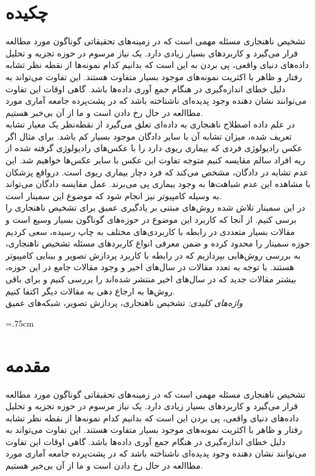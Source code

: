 \documentclass[12pt,a4paper]{report}
\newcommand*{\BeginNoToc}{%
  \addtocontents{toc}{%
    \edef\protect\SavedTocDepth{\protect\the\protect\value{tocdepth}}%
  }%
  \addtocontents{toc}{%
    \protect\setcounter{tocdepth}{-10}%
  }%
}
\newcommand*{\EndNoToc}{%
  \addtocontents{toc}{%
    \protect\setcounter{tocdepth}{\protect\SavedTocDepth}%
  }%
}
\theoremstyle{definition}
\theoremstyle{definition}
\begin{document}
	
	\chapter*{چکیده}
	تشخیص ناهنجاری‌ مسئله مهمی است که در زمینه‌های تحقیقاتی گوناگون مورد مطالعه قرار می‌گیرد و کاربرد‌های بسیار زیادی دارد. یک نیاز مرسوم در حوزه تجزیه و تحلیل داده‌های دنیای واقعی، پی بردن به این است که بدانیم کدام نمونه‌ها از نقطه نظر تشابه رفتار و ظاهر با اکثریت نمونه‌های موجود بسیار متفاوت هستند. این تفاوت می‌تواند به دلیل خطای انداز‌ه‌گیری در هنگام جمع آوری داده‌ها باشد. گاهی اوقات این تفاوت می‌توانند نشان‌ دهنده وجود پدیده‌ای ناشناخته‌ باشد که در پشت‌پرده جامعه آماری مورد مطاالعه در حال رخ دادن است و ما از آن بی‌خبر هستیم. \\

در علم داده اصطلاح ناهنجاری به داده‌ای تعلق می‌گیرد از نقطه‌نظر یک معیار تشابه تعریف شده، میزان تشابه آن با سایر دادگان موجود بسیار کم باشد. برای مثال اگر عکس رادیولوژی فردی که بیماری ریوی دارد را با عکس‌های رادیولوژی گرفته شده از ریه افراد سالم مقایسه کنیم متوجه تفاوت این عکس با سایر عکس‌ها خواهیم شد. این عدم تشابه در دادگان، مشخص می‌کند  که فرد دچار بیماری ریوی است. درواقع پزشکان با مشاهده این عدم شباهت‌ها به وجود بیماری پی می‌برند. عمل مقایسه دادگان می‌تواند به وسیله کامپیوتر نیز انجام شود که موضوع این سمینار است.\\

در این سمینار تلاش شده روش‌های مبتنی بر یادگیری عمیق برای تشخیص ناهنجاری را برسی کنیم. از آنجا که کاربرد این موضوع در حوزه‌های گوناگون بسیار وسیع است و مقالات بسیار متعددی در رابطه با کاربردی‌های مختلف به چاپ رسیده، سعی کردیم حوزه سمینار را محدود کرده و ضمن معرفی انواع کاربرد‌های مسئله تشخیص ناهنجاری، به بررسی روش‌هایی بپردازیم که در رابطه با کاربرد پردازش تصویر و بینایی کامپیوتر هستند. با توجه به تعدد مقالات در سال‌های اخیر و وجود مقالات جامع در این حوزه، بیشتر مقالات جدید که در سال‌های اخیر منتشر شده‌اند را بررسی کنیم و برای باقی روش‌ها به ارجاع دهی به مقالات دیگر اکتفا کنیم.\\

	\textit{
واژه‌های کلیدی:
	}
	تشخیص ناهنجاری، پردازش تصویر، شبکه‌های عمیق

	\newpage
	\baselineskip=1cm
	\BeginNoToc
	\tableofcontents
	\listoffigures
	\listoftables
	\EndNoToc
	
	\newpage
	
	\baselineskip=.75cm
	\chapter{مقدمه}
	تشخیص ناهنجاری‌ مسئله مهمی است که در زمینه‌های تحقیقاتی گوناگون مورد مطالعه قرار می‌گیرد و کاربرد‌های بسیار زیادی دارد. یک نیاز مرسوم در حوزه تجزیه و تحلیل داده‌های دنیای واقعی، پی بردن این است که بدانیم کدام نمونه‌ها از نقطه نظر تشابه رفتار و ظاهر با اکثریت نمونه‌های موجود بسیار متفاوت هستند. این تفاوت می‌تواند به دلیل خطای انداز‌ه‌گیری در هنگام جمع آوری داده‌ها باشد. گاهی اوقات این تفاوت می‌توانند نشان‌ دهنده وجود پدیده‌ای ناشناخته‌ باشد که در پشت‌پرده جامعه آماری مورد مطاالعه در حال رخ دادن است و ما از آن بی‌خبر هستیم. 
	
\end{document}

